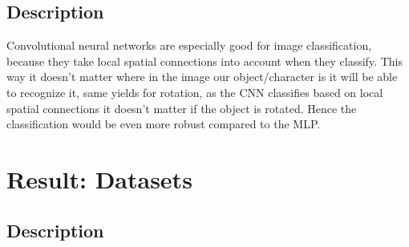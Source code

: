 \documentclass[Report.tex]{subfiles}
\begin{document}
\subsection{Description}
\begin{flushleft}
  Convolutional neural networks are especially good for image
  classification, because they take local spatial connections into account when
  they classify. This way it doesn't matter where in the image our
  object/character is it will be able to recognize it, same yields for rotation,
  as the CNN classifies based on local spatial connections it doesn't matter if
  the object is rotated. Hence the classification would be even more robust
  compared to the MLP.
\end{flushleft}

\section{Result: Datasets}
\subsection{Description}
\end{document}
